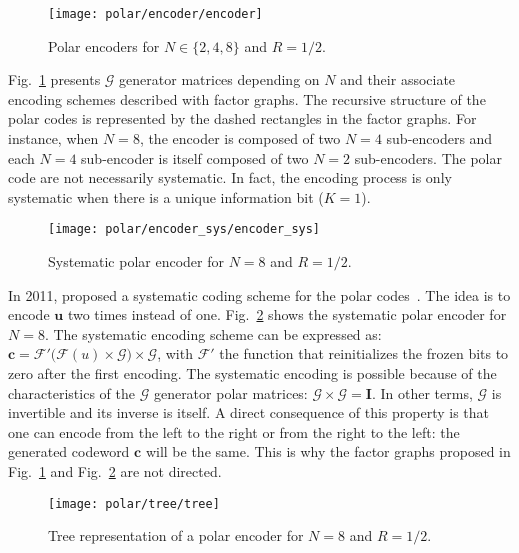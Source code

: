 \begin{figure}[htp]
  \centering
  \texttt{[image: polar/encoder/encoder]}
  \caption{Polar encoders for $N \in \{2, 4, 8\}$ and $R = 1/2$.}
  \label{fig:alg_polar_encoder}
\end{figure}

Fig.~\ref{fig:alg_polar_encoder} presents $\bm{\mathcal{G}}$ generator
matrices depending on $N$ and their associate encoding schemes described with
factor graphs. The recursive structure of the polar codes is represented by the
dashed rectangles in the factor graphs. For instance, when $N = 8$, the encoder
is composed of two $N = 4$ sub-encoders and each $N = 4$ sub-encoder is itself
composed of two $N = 2$ sub-encoders. The polar code are not necessarily
systematic. In fact, the encoding process is only systematic when there is a
unique information bit ($K =1$).

\begin{figure}[htp]
  \centering
  \texttt{[image: polar/encoder\_sys/encoder\_sys]}
  \caption{Systematic polar encoder for $N = 8$ and $R = 1/2$.}
  \label{fig:alg_polar_encoder_sys}
\end{figure}

In 2011, \Arikan proposed a systematic coding scheme for the polar
codes~\cite{Arikan2011}. The idea is to encode $\bm{u}$ two times instead of
one. Fig.~\ref{fig:alg_polar_encoder_sys} shows the systematic polar
encoder for $N = 8$. The systematic encoding scheme can be expressed as:
$\bm{c} = \mathcal{F'}\big(\mathcal{F}(u) \times \bm{\mathcal{G}}\big) \times
\bm{\mathcal{G}}$, with $\mathcal{F'}$ the function that reinitializes the
frozen bits to zero after the first encoding. The systematic encoding is
possible because of the characteristics of the $\bm{\mathcal{G}}$ generator
polar matrices: $\bm{\mathcal{G}} \times \bm{\mathcal{G}} = \bm{I}$. In other
terms, $\bm{\mathcal{G}}$ is invertible and its inverse is itself. A direct
consequence of this property is that one can encode from the left to the right
or from the right to the left: the generated codeword $\bm{c}$ will be the same.
This is why the factor graphs proposed in Fig.~\ref{fig:alg_polar_encoder} and
Fig.~\ref{fig:alg_polar_encoder_sys} are not directed.

\begin{figure}[htp]
  \centering
  \texttt{[image: polar/tree/tree]}
  \caption{Tree representation of a polar encoder for $N = 8$ and $R = 1/2$.}
  \label{fig:alg_polar_tree}
\end{figure}

